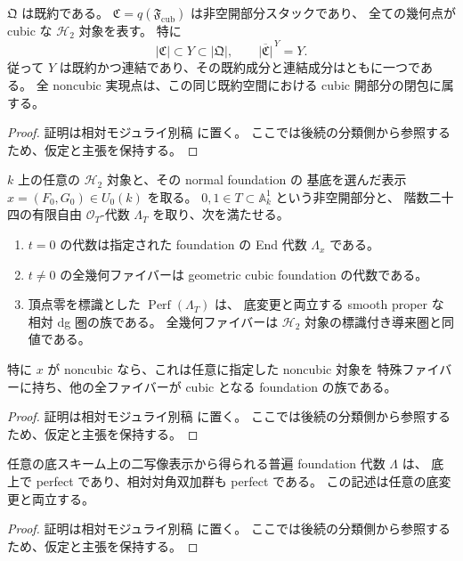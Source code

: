\begin{proposition}[実現点集合の既約性]
\label{prop:h2-component-density}
$\mathfrak Q$ は既約である。
$\mathfrak C=q(\mathfrak F_{\mathrm{cub}})$ は非空開部分スタックであり、
全ての幾何点が cubic な $\mathcal H_2$ 対象を表す。
特に
\[
 |\mathfrak C|\subset Y\subset|\mathfrak Q|,
 \qquad
 \overline{|\mathfrak C|}^{\,Y}=Y.
\]
従って $Y$ は既約かつ連結であり、その既約成分と連結成分はともに一つである。
全 noncubic 実現点は、この同じ既約空間における cubic 開部分の閉包に属する。
\end{proposition}

\begin{proof}
証明は相対モジュライ別稿 \cite[\texttt{foundation_stack} 節]{QuadricModuli2026} に置く。
ここでは後続の分類側から参照するため、仮定と主張を保持する。
\end{proof}

\begin{proposition}
\label{prop:h2-line-degeneration}
$k$ 上の任意の $\mathcal H_2$ 対象と、その normal foundation の
基底を選んだ表示 $x=(F_0,G_0)\in U_0(k)$ を取る。
$0,1\in T\subset\mathbb A^1_k$ という非空開部分と、
階数二十四の有限自由 $\mathcal O_T$-代数 $\Lambda_T$ を取り、次を満たせる。
\begin{enumerate}
\item $t=0$ の代数は指定された foundation の End 代数 $\Lambda_x$ である。
\item $t\ne0$ の全幾何ファイバーは geometric cubic foundation の代数である。
\item 頂点零を標識とした $\operatorname{Perf}(\Lambda_T)$ は、
      底変更と両立する smooth proper な相対 dg 圏の族である。
      全幾何ファイバーは $\mathcal H_2$ 対象の標識付き導来圏と同値である。
\end{enumerate}
特に $x$ が noncubic なら、これは任意に指定した noncubic 対象を
特殊ファイバーに持ち、他の全ファイバーが cubic となる foundation の族である。
\end{proposition}

\begin{proof}
証明は相対モジュライ別稿 \cite[\texttt{foundation_stack} 節]{QuadricModuli2026} に置く。
ここでは後続の分類側から参照するため、仮定と主張を保持する。
\end{proof}

\begin{lemma}
\label{lem:foundation-relative-smooth-proper}
任意の底スキーム上の二写像表示から得られる普遍 foundation 代数 $\Lambda$ は、
底上で perfect であり、相対対角双加群も perfect である。
この記述は任意の底変更と両立する。
\end{lemma}
\begin{proof}
証明は相対モジュライ別稿 \cite[\texttt{foundation_stack} 節]{QuadricModuli2026} に置く。
ここでは後続の分類側から参照するため、仮定と主張を保持する。
\end{proof}

